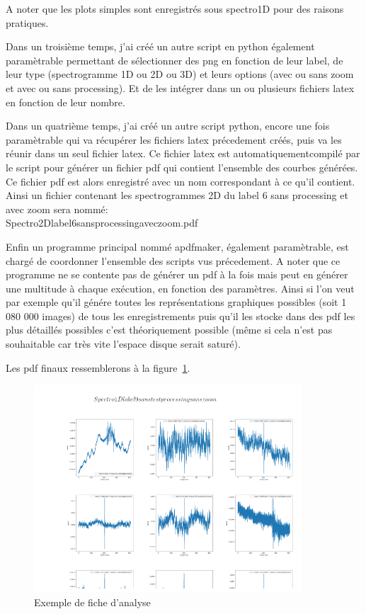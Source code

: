 A noter que les plots simples sont enregistrés sous spectro1D pour des raisons pratiques.

Dans un troisième temps, j'ai créé un autre script en python également paramètrable permettant de sélectionner des png en fonction de leur label, de leur type (spectrogramme 1D ou 2D ou 3D) et leurs options (avec ou sans zoom et avec ou sans processing).
Et de les intégrer dans un ou plusieurs fichiers latex en fonction de leur nombre.

Dans un quatrième temps, j'ai créé un autre script python, encore une fois paramètrable qui va récupérer les fichiers latex précedement créés, puis va les réunir dans un seul fichier latex.
Ce fichier latex est automatiquementcompilé par le script pour générer un fichier pdf
qui contient l'ensemble des courbes générées.
Ce fichier pdf est alors enregistré avec un nom correspondant à ce qu'il contient. Ainsi un fichier contenant les spectrogrammes 2D du label 6 sans processing et avec zoom sera nommé:\\ Spectro2Dlabel6sansprocessingaveczoom.pdf

Enfin un programme principal nommé apdfmaker, également paramètrable, est chargé de coordonner l'ensemble des scripts vus précedement.
A noter que ce programme ne se contente pas de générer un pdf à la fois mais peut
en générer une multitude à chaque exécution, en fonction des paramètres.
Ainsi si l'on veut par exemple qu'il génére toutes les représentations graphiques possibles (soit 1 080 000 images) de tous les enregistrements puis qu'il les stocke dans des pdf les plus détaillés possibles c'est théoriquement possible (même si cela n'est pas souhaitable  car très vite l'espace disque serait saturé).

Les pdf finaux ressemblerons à la figure~\ref{fig:exempledepdf}.

\begin{figure}[!h]
\centering
\includegraphics[width=10cm]{./images/pdfexemple.png}
\caption{Exemple de fiche d'analyse%
\label{fig:exempledepdf}}
\end{figure}
